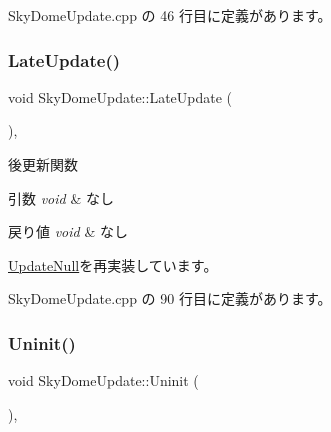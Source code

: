  Sky\+Dome\+Update.\+cpp の 46 行目に定義があります。

\mbox{\label{class_sky_dome_update_a94347cb50b4dc13528738a7b812da261}} 
\subsubsection{\texorpdfstring{Late\+Update()}{LateUpdate()}}
{\footnotesize\ttfamily void Sky\+Dome\+Update\+::\+Late\+Update (\begin{DoxyParamCaption}{ }\end{DoxyParamCaption})\hspace{0.3cm}{\ttfamily [override]}, {\ttfamily [virtual]}}



後更新関数 


\begin{DoxyParams}{引数}
{\em void} & なし \\
\hline
\end{DoxyParams}

\begin{DoxyRetVals}{戻り値}
{\em void} & なし \\
\hline
\end{DoxyRetVals}


\mbox{\hyperlink{class_update_null_a8d335882bce4eab384d44c4bae474ee5}{Update\+Null}}を再実装しています。



 Sky\+Dome\+Update.\+cpp の 90 行目に定義があります。

\mbox{\label{class_sky_dome_update_a54da74ef017a22075ce473abe1345489}} 
\subsubsection{\texorpdfstring{Uninit()}{Uninit()}}
{\footnotesize\ttfamily void Sky\+Dome\+Update\+::\+Uninit (\begin{DoxyParamCaption}{ }\end{DoxyParamCaption})\hspace{0.3cm}{\ttfamily [override]}, {\ttfamily [virtual]}}



